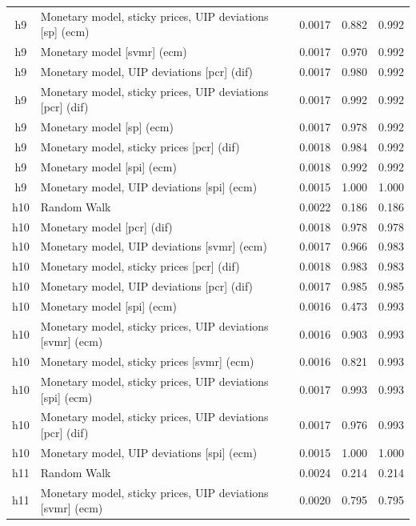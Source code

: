 \begin{ThreePartTable}
\begin{longtable}[t]{cp{5.5cm}ccc}
h9 & \raggedright Monetary model, sticky prices, UIP deviations [sp] (ecm) & 0.0017 & 0.882 & 0.992\\
h9 & \raggedright Monetary model [svmr] (ecm) & 0.0017 & 0.970 & 0.992\\
h9 & \raggedright Monetary model, UIP deviations [pcr] (dif) & 0.0017 & 0.980 & 0.992\\
h9 & \raggedright Monetary model, sticky prices, UIP deviations [pcr] (dif) & 0.0017 & 0.992 & 0.992\\
h9 & \raggedright Monetary model [sp] (ecm) & 0.0017 & 0.978 & 0.992\\
h9 & \raggedright Monetary model, sticky prices [pcr] (dif) & 0.0018 & 0.984 & 0.992\\
h9 & \raggedright Monetary model [spi] (ecm) & 0.0018 & 0.992 & 0.992\\
h9 & \raggedright Monetary model, UIP deviations [spi] (ecm) & 0.0015 & 1.000 & 1.000\\
\addlinespace
h10 & \raggedright Random Walk & 0.0022 & 0.186 & 0.186\\
h10 & \raggedright Monetary model [pcr] (dif) & 0.0018 & 0.978 & 0.978\\
h10 & \raggedright Monetary model, UIP deviations [svmr] (ecm) & 0.0017 & 0.966 & 0.983\\
h10 & \raggedright Monetary model, sticky prices [pcr] (dif) & 0.0018 & 0.983 & 0.983\\
h10 & \raggedright Monetary model, UIP deviations [pcr] (dif) & 0.0017 & 0.985 & 0.985\\
h10 & \raggedright Monetary model [spi] (ecm) & 0.0016 & 0.473 & 0.993\\
h10 & \raggedright Monetary model, sticky prices, UIP deviations [svmr] (ecm) & 0.0016 & 0.903 & 0.993\\
h10 & \raggedright Monetary model, sticky prices [svmr] (ecm) & 0.0016 & 0.821 & 0.993\\
h10 & \raggedright Monetary model, sticky prices, UIP deviations [spi] (ecm) & 0.0017 & 0.993 & 0.993\\
h10 & \raggedright Monetary model, sticky prices, UIP deviations [pcr] (dif) & 0.0017 & 0.976 & 0.993\\
h10 & \raggedright Monetary model, UIP deviations [spi] (ecm) & 0.0015 & 1.000 & 1.000\\
\addlinespace
h11 & \raggedright Random Walk & 0.0024 & 0.214 & 0.214\\
h11 & \raggedright Monetary model, sticky prices, UIP deviations [svmr] (ecm) & 0.0020 & 0.795 & 0.795\\

\end{longtable}
\end{ThreePartTable}
